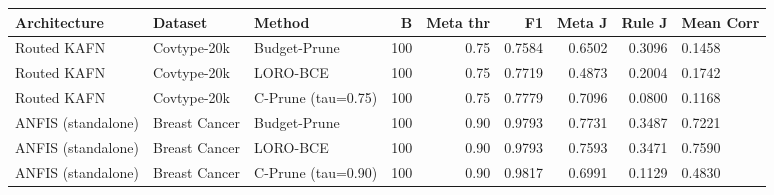 \begin{tabular}{lllrrrrr}
\toprule
Architecture & Dataset & Method & B & Meta thr & F1 & Meta J & Rule J & Mean Corr \\
\midrule
Routed KAFN & Covtype-20k & Budget-Prune & 100 & 0.75 & 0.7584 & 0.6502 & 0.3096 & 0.1458 \\
Routed KAFN & Covtype-20k & LORO-BCE & 100 & 0.75 & 0.7719 & 0.4873 & 0.2004 & 0.1742 \\
Routed KAFN & Covtype-20k & C-Prune (tau=0.75) & 100 & 0.75 & 0.7779 & 0.7096 & 0.0800 & 0.1168 \\
ANFIS (standalone) & Breast Cancer & Budget-Prune & 100 & 0.90 & 0.9793 & 0.7731 & 0.3487 & 0.7221 \\
ANFIS (standalone) & Breast Cancer & LORO-BCE & 100 & 0.90 & 0.9793 & 0.7593 & 0.3471 & 0.7590 \\
ANFIS (standalone) & Breast Cancer & C-Prune (tau=0.90) & 100 & 0.90 & 0.9817 & 0.6991 & 0.1129 & 0.4830 \\
\bottomrule
\end{tabular}

